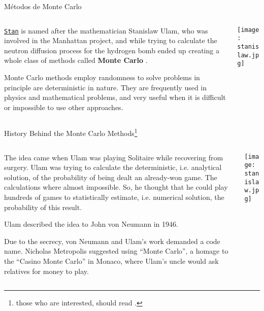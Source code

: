 \begin{frame}{Métodos de Monte Carlo}
	\begin{columns}
		\begin{column}{0.8\textwidth}
			\begin{vfilleditems}
				\item \href{http://mc-stan.org/}{\texttt{Stan}} is named after the mathematician Stanislaw Ulam,
				who was involved in the Manhattan project,
				and while trying to calculate the neutron diffusion process for the hydrogen bomb
				ended up creating a whole class of methods called \textbf{Monte Carlo} \parencite{eckhardtStanUlamJohn1987}.
				\item Monte Carlo methods employ randomness to solve problems in principle are deterministic in nature.
				They are frequently used in physics and mathematical problems,
				and very useful when it is difficult or impossible to use other approaches.
			\end{vfilleditems}
		\end{column}
		\begin{column}{0.2\textwidth}
			\centering
			\texttt{[image: stanislaw.jpg]}
		\end{column}
	\end{columns}
\end{frame}

\begin{frame}{History Behind the Monte Carlo Methods\footnote{those who are interested, should read \textcite{eckhardtStanUlamJohn1987}.}}
	\begin{columns}
		\begin{column}{0.8\textwidth}
			\begin{vfilleditems}
				\item The idea came when Ulam was playing Solitaire while recovering from surgery.
				Ulam was trying to calculate the deterministic, i.e. analytical solution,
				of the probability of being dealt an already-won game.
				The calculations where almost impossible.
				So, he thought that he could play hundreds of games to statistically estimate,
				i.e. numerical solution, the probability of this result.
				\item Ulam described the idea to John von Neumann in 1946.
				\item \small Due to the secrecy, von Neumann and Ulam's work demanded a code name.
				Nicholas Metropolis suggested using ``Monte Carlo'',
				a homage to the ``Casino Monte Carlo'' in Monaco,
				where Ulam's uncle would ask relatives for money to play.
			\end{vfilleditems}
		\end{column}
		\begin{column}{0.2\textwidth}
			\centering
			\texttt{[image: stanislaw.jpg]}
		\end{column}
	\end{columns}
\end{frame}

